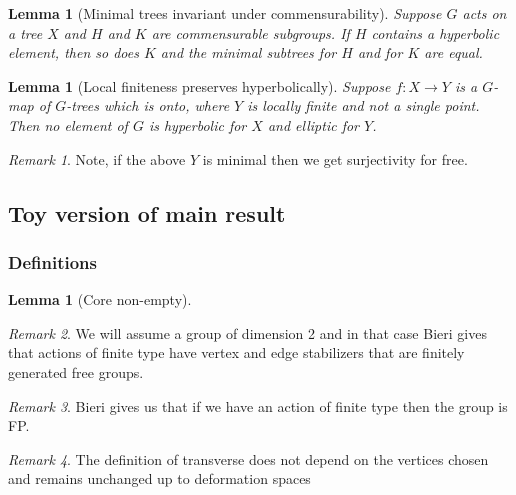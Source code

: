 \documentclass{article}
\theoremstyle{mystyle}
\newtheorem{lem}[thm]{Lemma}
\theoremstyle{remark}
\newtheorem{rmk}{Remark}[section]
\begin{document}
\begin{lem}
    [Minimal trees invariant under commensurability]
    \label{lem:commensurableminimal} 
    Suppose \(G\) acts on a tree \(X\) and \(H\) and \(K\) are commensurable subgroups. If \(H\) contains a hyperbolic element, then so does \(K\) and the minimal subtrees for \(H\) and for \(K\) are equal.
\end{lem}

\begin{lem}
    [Local finiteness preserves hyperbolically]
    \label{lem:localfinhyper} 
    Suppose \(f:X \to Y\) is a \(G\)-map of \(G\)-trees which is onto, where \(Y\) is locally finite and not a single point. Then no element of \(G\) is hyperbolic for \(X\) and elliptic for \(Y\).
\end{lem}

\begin{rmk}
    Note, if the above \(Y\) is minimal then we get surjectivity for free.
\end{rmk}






\subsection{Toy version of main result}


\subsubsection{Definitions}

\begin{lem}
    [Core non-empty]
    \label{lem:nonempty} 
\end{lem}

\begin{rmk}
    We will assume a group of dimension 2 and in that case Bieri gives that actions of finite type have vertex and edge stabilizers that are finitely generated free groups.
\end{rmk}

\begin{rmk}
    Bieri gives us that if we have an action of finite type then the group is FP.
\end{rmk}


\begin{rmk}
    The definition of transverse does not depend on the vertices chosen and remains unchanged up to deformation spaces
\end{rmk}
\end{document}
